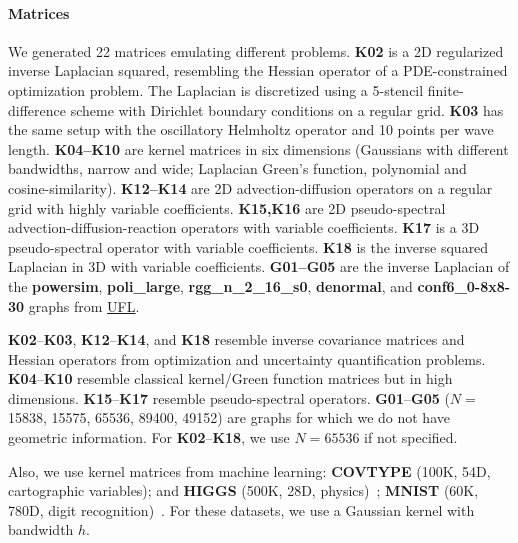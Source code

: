 
\paragraph{\textbf{Matrices}}
We generated 22 matrices emulating different problems.
{\bf K02} is a 2D regularized inverse Laplacian squared, 
resembling the Hessian operator of a PDE-constrained optimization problem. 
The Laplacian is discretized using a 5-stencil finite-difference scheme 
with Dirichlet boundary conditions on a regular grid. 
{\bf K03} has the same setup with the 
oscillatory Helmholtz operator and 10 points per wave length. 
{\bf K04--K10} are kernel matrices in six dimensions 
(Gaussians with different bandwidths, narrow and wide; 
Laplacian Green's function, polynomial and cosine-similarity).
{\bf K12--K14} are 2D advection-diffusion operators on a regular 
grid with highly variable coefficients. 
{\bf K15,K16} are 2D pseudo-spectral  advection-diffusion-reaction 
operators with variable coefficients. 
{\bf K17} is a 3D pseudo-spectral operator with variable coefficients. 
{\bf K18} is the inverse squared Laplacian in 3D with variable coefficients. 
{\bf G01--G05} are the inverse Laplacian of the  \textbf{powersim}, 
\textbf{poli\_large}, \textbf{rgg\_n\_2\_16\_s0}, 
\textbf{denormal}, and \textbf{conf6\_0-8x8-30} graphs from 
\href{http://yifanhu.net/GALLERY/GRAPHS/search.html}{UFL}.  

\textbf{K02}--\textbf{K03}, 
\textbf{K12}--\textbf{K14}, and \textbf{K18} resemble inverse 
covariance matrices and Hessian operators from optimization and 
uncertainty quantification problems. 
\textbf{K04}--\textbf{K10} resemble 
classical kernel/Green function matrices but in high dimensions. 
\textbf{K15}--\textbf{K17} resemble pseudo-spectral operators.
\textbf{G01}--\textbf{G05} ($N=$ 15838, 15575, 65536, 89400, 49152)
are graphs for which we do not have geometric information.
For \textbf{K02}--\textbf{K18}, we use $N=65536$ if not specified.

Also, we use kernel matrices from machine learning: 
\textbf{COVTYPE} (100K, 54D, cartographic variables); and
\textbf{HIGGS} (500K, 28D,  physics)~\cite{Lichman:2013};
\textbf{MNIST} (60K, 780D, digit recognition)~\cite{chang2011libsvm}.
For these datasets, we use a Gaussian kernel with bandwidth $h$.

